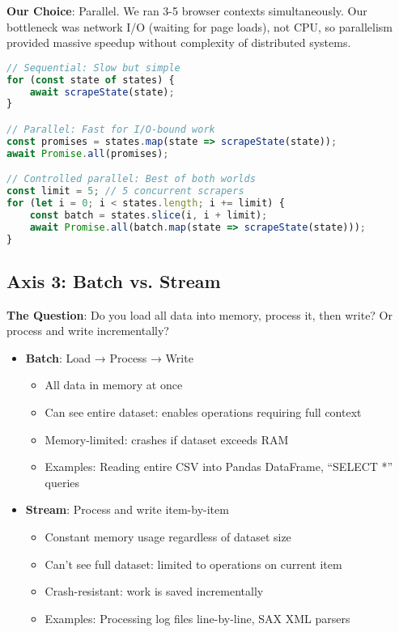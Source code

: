 \documentclass[11pt,a4paper]{article}
\begin{document}
\textbf{Our Choice}: Parallel. We ran 3-5 browser contexts simultaneously. Our bottleneck was network I/O (waiting for page loads), not CPU, so parallelism provided massive speedup without complexity of distributed systems.

\begin{lstlisting}[language=JavaScript,caption={Parallel scraping with browser contexts}]
// Sequential: Slow but simple
for (const state of states) {
    await scrapeState(state);
}

// Parallel: Fast for I/O-bound work
const promises = states.map(state => scrapeState(state));
await Promise.all(promises);

// Controlled parallel: Best of both worlds
const limit = 5; // 5 concurrent scrapers
for (let i = 0; i < states.length; i += limit) {
    const batch = states.slice(i, i + limit);
    await Promise.all(batch.map(state => scrapeState(state)));
}
\end{lstlisting}

\subsection{Axis 3: Batch vs. Stream}

\textbf{The Question}: Do you load all data into memory, process it, then write? Or process and write incrementally?

\begin{itemize}
    \item \textbf{Batch}: Load → Process → Write
    \begin{itemize}
        \item All data in memory at once
        \item Can see entire dataset: enables operations requiring full context
        \item Memory-limited: crashes if dataset exceeds RAM
        \item Examples: Reading entire CSV into Pandas DataFrame, ``SELECT *'' queries
    \end{itemize}

    \item \textbf{Stream}: Process and write item-by-item
    \begin{itemize}
        \item Constant memory usage regardless of dataset size
        \item Can't see full dataset: limited to operations on current item
        \item Crash-resistant: work is saved incrementally
        \item Examples: Processing log files line-by-line, SAX XML parsers
    \end{itemize}
\end{itemize}
\end{document}
